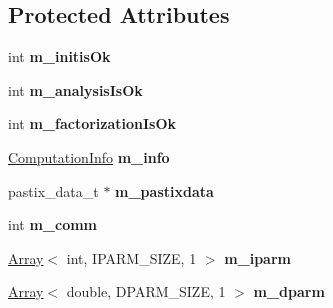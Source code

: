 \subsection*{Protected Attributes}
\begin{DoxyCompactItemize}
\item 
\mbox{\label{class_eigen_1_1_pastix_base_aaec1e805c8ea06e946a04e3bd4cd13fe}} 
int {\bfseries m\+\_\+initis\+Ok}
\item 
\mbox{\label{class_eigen_1_1_pastix_base_a9bf581a78008c1b10784ce12ef9f4d24}} 
int {\bfseries m\+\_\+analysis\+Is\+Ok}
\item 
\mbox{\label{class_eigen_1_1_pastix_base_a238a5fcf1f5ddde5e8996b8d971e3882}} 
int {\bfseries m\+\_\+factorization\+Is\+Ok}
\item 
\mbox{\label{class_eigen_1_1_pastix_base_ae37b176f45ed1f4145c19a6bd1742863}} 
\hyperlink{group__enums_ga85fad7b87587764e5cf6b513a9e0ee5e}{Computation\+Info} {\bfseries m\+\_\+info}
\item 
\mbox{\label{class_eigen_1_1_pastix_base_ade3df286018f7a5de946eb8ae36f71cf}} 
pastix\+\_\+data\+\_\+t $\ast$ {\bfseries m\+\_\+pastixdata}
\item 
\mbox{\label{class_eigen_1_1_pastix_base_af081942a2221ed4a4996b702613a4c4f}} 
int {\bfseries m\+\_\+comm}
\item 
\mbox{\label{class_eigen_1_1_pastix_base_afcde1367e4b3b8782e47286a14ffd4c8}} 
\hyperlink{group___core___module_class_eigen_1_1_array}{Array}$<$ int, I\+P\+A\+R\+M\+\_\+\+S\+I\+ZE, 1 $>$ {\bfseries m\+\_\+iparm}
\item 
\mbox{\label{class_eigen_1_1_pastix_base_ad6180b9f61599c1df13ce2936c9b47f2}} 
\hyperlink{group___core___module_class_eigen_1_1_array}{Array}$<$ double, D\+P\+A\+R\+M\+\_\+\+S\+I\+ZE, 1 $>$ {\bfseries m\+\_\+dparm}
\item 
\mbox{\label{class_eigen_1_1_pastix_base_a7608cf9d38d1a04ccea6f7f2664bd081}} 

\end{DoxyCompactItemize}

